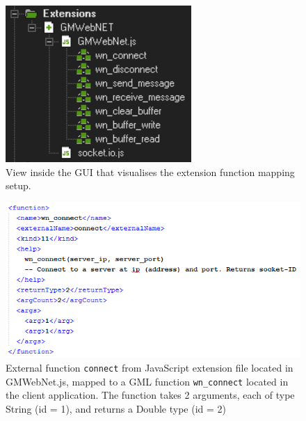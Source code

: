 \documentclass[bsc,frontabs,twoside,singlespacing,parskip,deptreport]{infthesis}     %
\begin{document}
\begin{figure}[H]
\centering
\includegraphics[scale=1.2]{images/extensions_folder.png}
\caption{View inside the GUI that visualises the extension function mapping setup.}
\label{fig:extension_folder}
\vspace{1em}
\end{figure}

\begin{figure}[H]
\centering
\includegraphics[scale=1.2]{images/xml_mapping.png}
\caption{External function \texttt{connect} from JavaScript extension file located in GMWebNet.js, mapped to a GML function \texttt{wn\_connect} located in the client application. The function takes 2 arguments, each of type String (id = 1), and returns a Double type (id = 2)}
\label{fig:xml_mapping}
\vspace{1em}
\end{figure}
\end{document}
